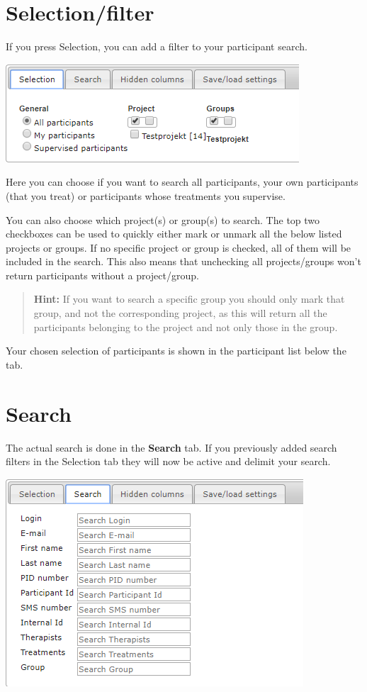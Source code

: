 \documentclass[
]{book}
\begin{document}
\section{Selection/filter}\label{selectionfilter}

If you press Selection, you can add a filter to your participant search.

\includegraphics{images/selection-filter.png}

Here you can choose if you want to search all participants, your own participants (that you treat) or participants whose treatments you supervise.

You can also choose which project(s) or group(s) to search. The top two checkboxes can be used to quickly either mark or unmark all the below listed projects or groups. If no specific project or group is checked, all of them will be included in the search. This also means that unchecking all projects/groups won't return participants without a project/group.

\begin{quote}
\textbf{Hint:} If you want to search a specific group you should only mark that group, and not the corresponding project, as this will return all the participants belonging to the project and not only those in the group.
\end{quote}

Your chosen selection of participants is shown in the participant list below the tab.

\section{Search}\label{search}

The actual search is done in the \textbf{Search} tab. If you previously added search filters in the Selection tab they will now be active and delimit your search.

\includegraphics{images/search.png}
\end{document}
